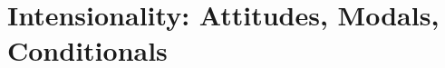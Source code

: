 \documentclass{kvf-lecturenotes}
\begin{document}
\dominitoc



\mainmatter

\pagestyle{kaiheadings}

\part{Intensionality: Attitudes, Modals, Conditionals}

 


% 

%
%
%
%

\printbibliography
 
\end{document}
